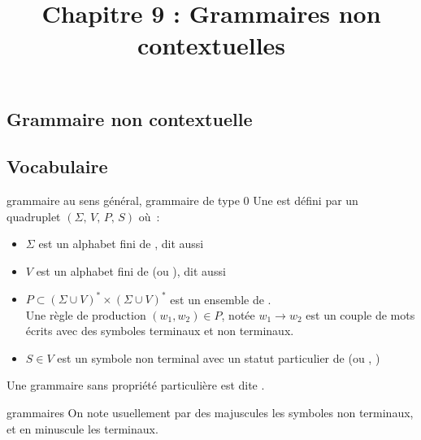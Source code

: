 

\begin{adjustwidth}{-3cm}{-3cm}

\setcounter{chapitre}{9}

\title{Chapitre 9 : Grammaires non contextuelles}
\maketitle

\section{Grammaire non contextuelle}

\subsection{Vocabulaire}

\begin{definition}{}{grammaire au sens général, grammaire de type 0}
    Une  est défini par un quadruplet $(\Sigma,\,V,\,P,\,S)$ où~:
    \begin{itemize}
        \item $\Sigma$ est un alphabet fini de , dit aussi 
        \item $V$ est un alphabet fini de  (ou ), dit aussi 
        \item $P \subset (\Sigma \cup V)^* \times (\Sigma \cup V)^* $ est un ensemble de .\\
        Une règle de production $(w_1,w_2) \in P$, notée $w_1 \to w_2$ est un couple de mots écrits avec des symboles terminaux et non terminaux.
        \item $S \in V$ est un symbole non terminal avec un statut particulier de  (ou , )
    \end{itemize}
    Une grammaire sans propriété particulière est dite .
\end{definition}

\begin{remarque}{}{grammaires}
    On note usuellement par des majuscules les symboles non terminaux, et en minuscule les terminaux.
\end{remarque}


\end{adjustwidth}
